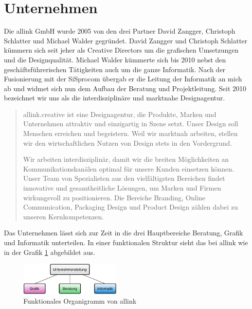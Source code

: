 \section{Unternehmen}
Die allink GmbH wurde 2005 von den drei Partner David Zangger, Christoph Schlatter
und Michael Walder gegründet. David Zangger und Christoph Schlatter kümmern sich
seit jeher als Creative Directors um die grafischen Umsetzungen und die Designqualität.
Michael Walder kümmerte sich bis 2010 nebst den geschäftsführerischen Tätigkeiten
auch um die ganze Informatik. Nach der Fusionierung mit der SiSprocom übergab
er die Leitung der Informatik an mich ab und widmet sich nun dem Aufbau der
Beratung und Projektleitung. Seit 2010 bezeichnet wir uns als die interdisziplinäre 
und marktnahe Designagentur.

\begin{quote}
allink.creative ist eine Designagentur, die Produkte, Marken und Unternehmen 
attraktiv und einzigartig in Szene setzt. Unser Design soll Menschen erreichen 
und begeistern. Weil wir marktnah arbeiten, stellen wir den wirtschaftlichen 
Nutzen von Design stets in den Vordergrund.

Wir arbeiten interdisziplinär, damit wir die breiten Möglichkeiten an 
Kommunikationskanälen optimal für unsere Kunden einsetzen können. Unser 
Team von Spezialisten aus den vielfältigsten Bereichen findet innovative 
und gesamtheitliche Lösungen, um Marken und Firmen wirkungsvoll zu positionieren. 
Die Bereiche Branding, Online Communication, Packaging Design und Product 
Design zählen dabei zu unseren Kernkompetenzen.
\end{quote}

Das Unternehmen lässt sich zur Zeit in die drei Hauptbereiche Beratung, Grafik
und Informatik unterteilen. In einer funktionalen Struktur sieht das bei allink wie in
der Grafik \ref{pic:funktionales_organigramm} abgebildet aus.

\begin{figure}[htbp]
\begin{center}
\includegraphics[width=0.45\textwidth,angle=0]{./bilder/funktionales_organigramm.pdf}
\caption{Funktionales Organigramm von allink}
\label{pic:funktionales_organigramm}
\end{center}
\end{figure}

